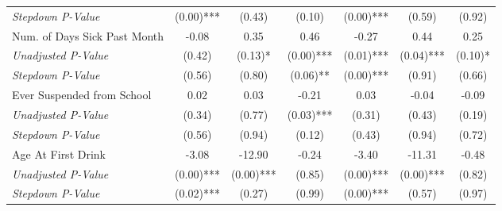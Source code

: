 \begin{tabular}{l c c c c c c}
\quad \textit{Stepdown P-Value} & (0.00)*** & (0.43) & (0.10) & (0.00)*** & (0.59) & (0.92) \\
Num. of Days Sick Past Month & -0.08 & 0.35 & 0.46 & -0.27 & 0.44 & 0.25 \\
\quad \textit{Unadjusted P-Value} & (0.42) & (0.13)* & (0.00)*** & (0.01)*** & (0.04)*** & (0.10)* \\
\quad \textit{Stepdown P-Value} & (0.56) & (0.80) & (0.06)** & (0.00)*** & (0.91) & (0.66) \\
Ever Suspended from School & 0.02 & 0.03 & -0.21 & 0.03 & -0.04 & -0.09 \\
\quad \textit{Unadjusted P-Value} & (0.34) & (0.77) & (0.03)*** & (0.31) & (0.43) & (0.19) \\
\quad \textit{Stepdown P-Value} & (0.56) & (0.94) & (0.12) & (0.43) & (0.94) & (0.72) \\
Age At First Drink & -3.08 & -12.90 & -0.24 & -3.40 & -11.31 & -0.48 \\
\quad \textit{Unadjusted P-Value} & (0.00)*** & (0.00)*** & (0.85) & (0.00)*** & (0.00)*** & (0.82) \\
\quad \textit{Stepdown P-Value} & (0.02)*** & (0.27) & (0.99) & (0.00)*** & (0.57) & (0.97) \\
\bottomrule
\end{tabular}
